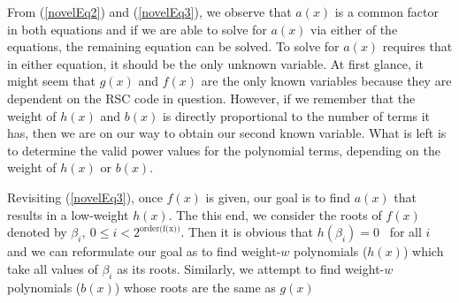 From (\ref{novelEq2})  and (\ref{novelEq3}), we observe that $a(x)$ is a common factor in both equations and if we are able to solve for $a(x)$ via either of the equations, the remaining equation can be solved. To solve for $a(x)$ requires that in either equation, it should be the only unknown variable. At first glance, it might seem that $g(x)$ and $f(x)$ are the only known variables because they are dependent on the RSC code in question. However, if we remember that the weight of $h(x)$ and $b(x)$ is directly proportional to the number of terms it has, then we are on our way to obtain our second known variable. What is left is to determine the valid power values for the polynomial  terms, depending on the weight of $h(x)$ or $b(x)$.

Revisiting (\ref{novelEq3}), once $f(x)$ is given, our goal is to find $a(x)$ that results in a low-weight $h(x)$. The this end, we consider the roots of $f(x)$ denoted by $\beta_i,~ 0 \leq i < 2^{\text{order(f(x))}}$. Then it is obvious that $h(\beta_i)=0$~ for all $i$ and we can reformulate our goal as to find weight-$w$ polynomials ($h(x)$) which take all values of $\beta_i$ as its roots. Similarly, we attempt to find weight-$w$ polynomials ($b(x)$) whose roots are the same as $g(x)$


